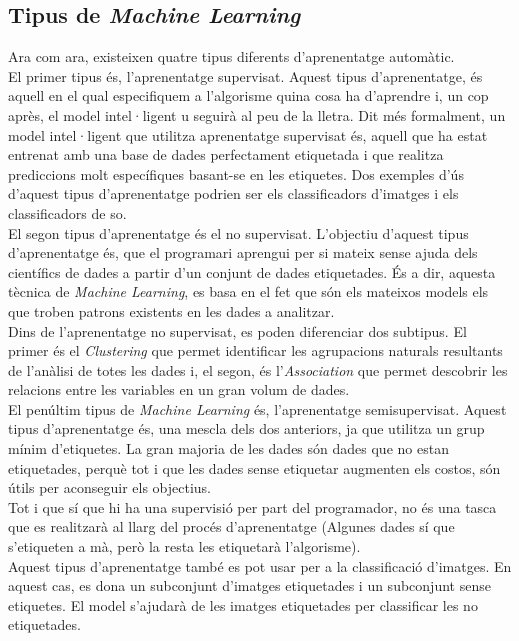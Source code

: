 \documentclass[a4paper,12pt]{report}
\begin{document}
\subsection*{Tipus de \textit{Machine Learning}}
Ara com ara, existeixen quatre tipus diferents d'aprenentatge automàtic.\\
El primer tipus és, l'aprenentatge supervisat. Aquest tipus d'aprenentatge, és aquell en el qual especifiquem a l'algorisme quina cosa ha d'aprendre i, un cop après, el model intel·ligent u seguirà al peu de la lletra. Dit més formalment, un model intel·ligent que utilitza aprenentatge supervisat és, aquell que ha estat entrenat amb una base de dades perfectament etiquetada i que realitza prediccions molt específiques basant-se en les etiquetes. Dos exemples d'ús d'aquest tipus d'aprenentatge podrien ser els classificadors d'imatges i els classificadors de so.\\
El segon tipus d'aprenentatge és el no supervisat. L'objectiu d'aquest tipus d'aprenentatge és, que el programari aprengui per si mateix sense ajuda dels científics de dades a partir d'un conjunt de dades etiquetades. És a dir, aquesta tècnica de \textit{Machine Learning}, es basa en el fet que són els mateixos models els que troben patrons existents en les dades a analitzar.\\
Dins de l'aprenentatge no supervisat, es poden diferenciar dos subtipus. El primer és el \textit{Clustering} que permet identificar les agrupacions naturals resultants de l'anàlisi de totes les dades i, el segon, és l'\textit{Association} que permet descobrir les relacions entre les variables en un gran volum de dades.\\
El penúltim tipus de \textit{Machine Learning} és, l'aprenentatge semisupervisat. Aquest tipus d'aprenentatge és, una mescla dels dos anteriors, ja que utilitza un grup mínim d'etiquetes. La gran majoria de les dades són dades que no estan etiquetades, perquè tot i que les dades sense etiquetar augmenten els costos, són útils per aconseguir els objectius.\\
Tot i que sí que hi ha una supervisió per part del programador, no és una tasca que es realitzarà al llarg del procés d'aprenentatge (Algunes dades sí que s'etiqueten a mà, però la resta les etiquetarà l'algorisme).\\
Aquest tipus d'aprenentatge també es pot usar per a la classificació d'imatges. En aquest cas, es dona un subconjunt d'imatges etiquetades i un subconjunt sense etiquetes. El model s'ajudarà de les imatges etiquetades per classificar les no etiquetades.\\
\end{document}

